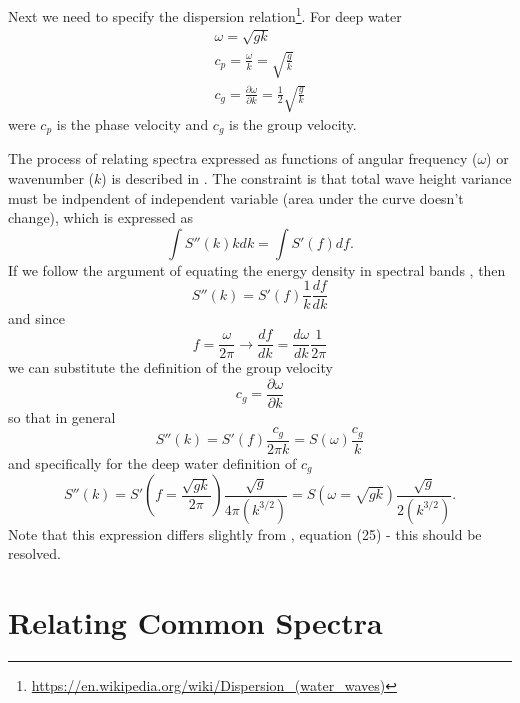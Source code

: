 \documentclass[11pt]{article}
\begin{document}
Next we need to specify the dispersion relation\footnote{\url{https://en.wikipedia.org/wiki/Dispersion_(water_waves)}}.  For deep water 
\begin{eqnarray}
\omega = \sqrt{gk} \\
c_p = \frac{\omega}{k}=\sqrt{\frac{g}{k}} \\
c_g = \frac{\partial \omega}{\partial k} = \frac{1}{2} \sqrt{\frac{g}{k}}
\end{eqnarray}
were $c_p$ is the phase velocity and $c_g$ is the group velocity.

The process of relating spectra expressed as functions of angular frequency ($\omega$) or wavenumber ($k$) is described in \cite{plant09ocean}.  The constraint is that total wave height variance must be indpendent of independent variable (area under the curve doesn't change), which is expressed as
\begin{equation}
\int S''(k) k dk = \int S'(f) df.
\end{equation}
If we follow the argument of equating the energy density in spectral bands \cite{}, then
\begin{equation} S''(k) = S'(f) \frac{1}{k} \frac{df}{dk}\end{equation}
and since
\begin{equation} f = \frac{\omega}{2 \pi} \rightarrow \frac{df}{dk}=\frac{d\omega}{dk}\frac{1}{2 \pi} \end{equation}
we can substitute the definition of the group velocity
\begin{equation} c_g = \frac{\partial \omega}{\partial k} \end{equation}
so that in general
\begin{equation} S''(k) = S'(f) \frac{c_g}{2 \pi k} = S(\omega) \frac{c_g}{k}\end{equation}
and specifically for the deep water definition of $c_g$
\begin{equation} S''(k) = 
S'\left(f=\frac{\sqrt{gk}}{2\pi}\right) \frac{\sqrt{g}}{4 \pi \left(k^{3/2}\right)} = 
S\left(\omega=\sqrt{gk}\right)\frac{\sqrt{g}}{2 \left(k^{3/2}\right)}.
\label{e:ss}
\end{equation}
Note that this expression differs slightly from  \cite{frechot06realistic}, equation (25) - this should be resolved.

\section{Relating Common Spectra}
\end{document}
